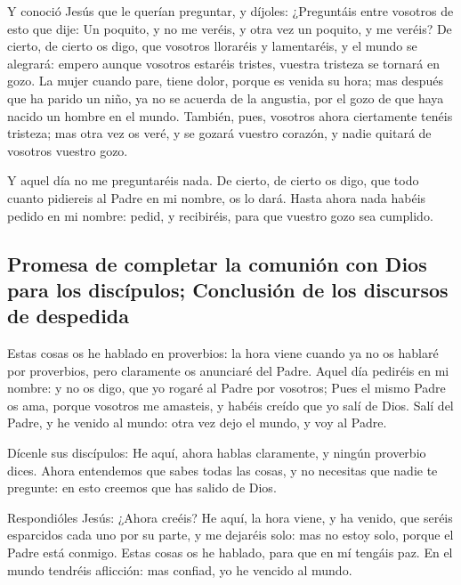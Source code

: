  Y conoció Jesús que le querían preguntar, y díjoles:
¿Preguntáis entre vosotros de esto que dije: Un poquito, y no me veréis,
y otra vez un poquito, y me veréis?  De cierto, de cierto
os digo, que vosotros lloraréis y lamentaréis, y el mundo se alegrará:
empero aunque vosotros estaréis tristes, vuestra tristeza se tornará en
gozo.  La mujer cuando pare, tiene dolor, porque es venida
su hora; mas después que ha parido un niño, ya no se acuerda de la
angustia, por el gozo de que haya nacido un hombre en el mundo.
 También, pues, vosotros ahora ciertamente tenéis tristeza;
mas otra vez os veré, y se gozará vuestro corazón, y nadie quitará de
vosotros vuestro gozo.

 Y aquel día no me preguntaréis nada. De cierto, de cierto
os digo, que todo cuanto pidiereis al Padre en mi nombre, os lo dará.
 Hasta ahora nada habéis pedido en mi nombre: pedid, y
recibiréis, para que vuestro gozo sea cumplido.

\hypertarget{promesa-de-completar-la-comuniuxf3n-con-dios-para-los-discuxedpulos-conclusiuxf3n-de-los-discursos-de-despedida}{%
\subsection{Promesa de completar la comunión con Dios para los
discípulos; Conclusión de los discursos de
despedida}\label{promesa-de-completar-la-comuniuxf3n-con-dios-para-los-discuxedpulos-conclusiuxf3n-de-los-discursos-de-despedida}}

 Estas cosas os he hablado en proverbios: la hora viene
cuando ya no os hablaré por proverbios, pero claramente os anunciaré del
Padre.  Aquel día pediréis en mi nombre: y no os digo, que
yo rogaré al Padre por vosotros;  Pues el mismo Padre os
ama, porque vosotros me amasteis, y habéis creído que yo salí de Dios.
 Salí del Padre, y he venido al mundo: otra vez dejo el
mundo, y voy al Padre.

 Dícenle sus discípulos: He aquí, ahora hablas claramente,
y ningún proverbio dices.  Ahora entendemos que sabes todas
las cosas, y no necesitas que nadie te pregunte: en esto creemos que has
salido de Dios.

 Respondióles Jesús: ¿Ahora creéis?  He aquí,
la hora viene, y ha venido, que seréis esparcidos cada uno por su parte,
y me dejaréis solo: mas no estoy solo, porque el Padre está conmigo.
 Estas cosas os he hablado, para que en mí tengáis paz. En
el mundo tendréis aflicción: mas confiad, yo he vencido al mundo.

